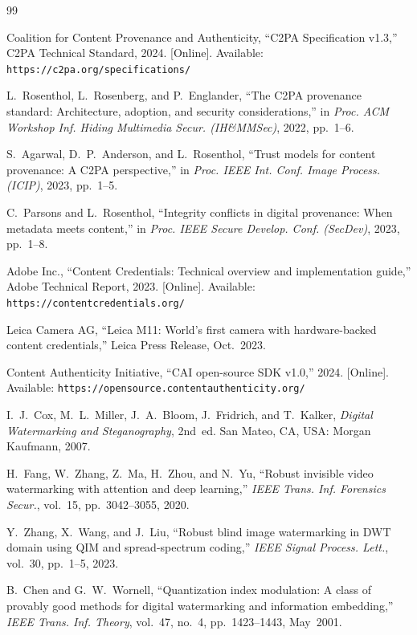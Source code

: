 \documentclass[conference]{IEEEtran}
\begin{document}
\begin{thebibliography}{99}

Coalition for Content Provenance and Authenticity,
``C2PA Specification v1.3,'' C2PA Technical Standard, 2024.
[Online]. Available: \texttt{https://c2pa.org/specifications/}

L.~Rosenthol, L.~Rosenberg, and P.~Englander,
``The C2PA provenance standard: Architecture, adoption, and security
considerations,'' in \textit{Proc. ACM Workshop Inf. Hiding Multimedia
Secur. (IH\&MMSec)}, 2022, pp.~1--6.

S.~Agarwal, D.~P.~Anderson, and L.~Rosenthol,
``Trust models for content provenance: A C2PA perspective,''
in \textit{Proc. IEEE Int. Conf. Image Process. (ICIP)}, 2023,
pp.~1--5.

C.~Parsons and L.~Rosenthol,
``Integrity conflicts in digital provenance: When metadata meets
content,'' in \textit{Proc. IEEE Secure Develop. Conf. (SecDev)},
2023, pp.~1--8.

Adobe Inc.,
``Content Credentials: Technical overview and implementation guide,''
Adobe Technical Report, 2023.
[Online]. Available: \texttt{https://contentcredentials.org/}

Leica Camera AG,
``Leica M11: World's first camera with hardware-backed content
credentials,'' Leica Press Release, Oct.~2023.

Content Authenticity Initiative,
``CAI open-source SDK v1.0,'' 2024.
[Online]. Available: \texttt{https://opensource.contentauthenticity.org/}

I.~J.~Cox, M.~L.~Miller, J.~A.~Bloom, J.~Fridrich, and T.~Kalker,
\textit{Digital Watermarking and Steganography}, 2nd~ed.
San Mateo, CA, USA: Morgan Kaufmann, 2007.

H.~Fang, W.~Zhang, Z.~Ma, H.~Zhou, and N.~Yu,
``Robust invisible video watermarking with attention and deep learning,''
\textit{IEEE Trans. Inf. Forensics Secur.}, vol.~15, pp.~3042--3055, 2020.

Y.~Zhang, X.~Wang, and J.~Liu,
``Robust blind image watermarking in DWT domain using QIM and
spread-spectrum coding,''
\textit{IEEE Signal Process. Lett.}, vol.~30, pp.~1--5, 2023.

B.~Chen and G.~W.~Wornell,
``Quantization index modulation: A class of provably good methods for
digital watermarking and information embedding,''
\textit{IEEE Trans. Inf. Theory}, vol.~47, no.~4, pp.~1423--1443, May~2001.


\end{thebibliography}
\end{document}

